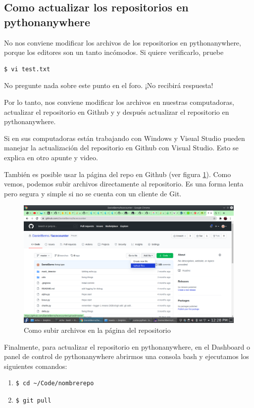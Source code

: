 \documentclass[10pt,a4paper]{article}
\begin{document}
\subsection{Como actualizar los repositorios en pythonanywhere}

No nos conviene modificar los archivos de los repositorios en pythonanywhere, porque los editores
son un tanto incómodos. Si quiere verificarlo, pruebe
\begin{verbatim}
$ vi test.txt
\end{verbatim}
No pregunte nada sobre este punto en el foro. ¡No recibirá respuesta!

Por lo tanto, nos conviene modificar los archivos en nuestras computadoras, actualizar el repositorio en Github y 
y después actualizar el repositorio en pythonanywhere. 

Si en sus computadoras están trabajando con Windows y Visual Studio pueden manejar la actualización del repositorio en Github con Visual Studio. Esto se explica en otro apunte y video. 

También es posible usar la página del repo en Github (ver figura \ref{fig:uploadfile}). Como vemos, podemos subir archivos directamente al repositorio. Es una forma lenta pero segura y simple si no se cuenta con un cliente de Git.

\begin{figure}
	\centering
	\includegraphics[width=1\linewidth]{sc/upload_file}
	\caption{Como subir archivos en la página del repositorio}
	\label{fig:uploadfile}
\end{figure}

Finalmente, para actualizar el repositorio en pythonanywhere, en el Dashboard o panel de control de pythonanywhere abrirmos una consola bash y ejecutamos los siguientes comandos:
\begin{enumerate}
	\item \begin{verbatim}
$ cd ~/Code/nombrerepo
	\end{verbatim}
    \item \begin{verbatim}
$ git pull
    \end{verbatim}
\end{enumerate}
\end{document}
